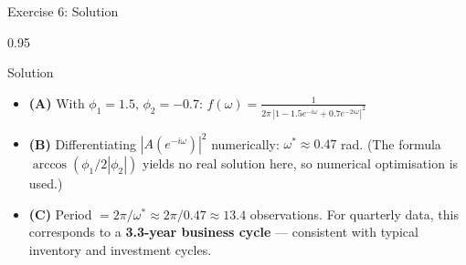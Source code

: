 \documentclass[9pt, aspectratio=169, t]{beamer}
\begin{document}
\begin{frame}{Exercise 6: Solution}
    \begin{cminipage}{0.95\textwidth}
    \begin{exampleblock}{Solution}
        {\small
        \begin{itemize}\setlength{\itemsep}{3pt}
            \item \textcolor{MainBlue}{\textbf{(A)}} With $\phi_1 = 1.5$, $\phi_2 = -0.7$:
                $f(\omega) = \frac{1}{2\pi\,|1 - 1.5e^{-i\omega} + 0.7e^{-2i\omega}|^2}$
            \item \textcolor{MainBlue}{\textbf{(B)}} Differentiating $|A(e^{-i\omega})|^2$ numerically: $\omega^* \approx 0.47$ rad. (The formula $\arccos(\phi_1/2|\phi_2|)$ yields no real solution here, so numerical optimisation is used.)
            \item \textcolor{MainBlue}{\textbf{(C)}} Period $= 2\pi/\omega^* \approx 2\pi/0.47 \approx 13.4$ observations. For quarterly data, this corresponds to a \textbf{3.3-year business cycle} --- consistent with typical inventory and investment cycles.
        \end{itemize}
        }
    \end{exampleblock}
    \end{cminipage}
\end{frame}
\end{document}
